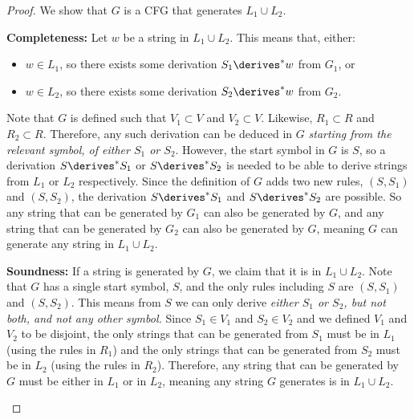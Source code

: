 \begin{problem}
\begin{enumalph}
\begin{Answer}
\begin{claim}
        \begin{proof}
          We show that $G$ is a CFG that generates $L_1 \cup L_2$.
          \begin{enumroman}
            \item \textbf{Completeness:}
              Let $w$ be a string in $L_1 \cup L_2$.
              This means that, either:
              \begin{itemize}
                \item $w \in L_1$, so there exists some derivation $S_1 \derives^* w$ from $G_1$, or
                \item $w \in L_2$, so there exists some derivation $S_2 \derives^* w$ from $G_2$.
              \end{itemize}
              Note that $G$ is defined such that $V_1 \subset V$ and $V_2 \subset V$.
              Likewise, $R_1 \subset R$ and $R_2 \subset R$.
              Therefore, any such derivation can be deduced in $G$
              \emph{starting from the relevant symbol, of either $S_1$ or $S_2$}.
              However, the start symbol in $G$ is $S$, so a derivation
              $S \derives^* S_1$ or $S \derives^* S_2$ is needed to be able to
              derive strings from $L_1$ or $L_2$ respectively.
              Since the definition of $G$ adds two new rules, $(S, S_1)$ and $(S, S_2)$,
              the derivation $S \derives^* S_1$ and $S \derives^* S_2$ are possible.
              So any string that can be generated by $G_1$ can also be generated by $G$,
              and any string that can be generated by $G_2$ can also be generated by $G$,
              meaning $G$ can generate any string in $L_1 \cup L_2$.
            \item \textbf{Soundness:}
              If a string is generated by $G$, we claim that it is in $L_1 \cup L_2$.
              Note that $G$ has a single start symbol, $S$,
              and the only rules including $S$ are $(S, S_1)$ and $(S, S_2)$.
              This means from $S$ we can only derive
              \emph{either $S_1$ or $S_2$, but not both, and not any other symbol.}
              Since $S_1 \in V_1$ and $S_2 \in V_2$ and we defined $V_1$ and $V_2$
              to be disjoint, the only strings that can be generated from $S_1$
              must be in $L_1$ (using the rules in $R_1$)
              and the only strings that can be generated from $S_2$
              must be in $L_2$ (using the rules in $R_2$).
              Therefore, any string that can be generated by $G$ must be either
              in $L_1$ or in $L_2$, meaning any string $G$ generates is in $L_1 \cup L_2$.

\end{enumroman}
\end{proof}
\end{claim}
\end{Answer}
\end{enumalph}
\end{problem}
